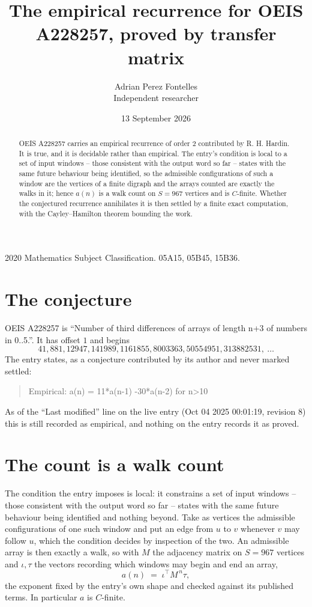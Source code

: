 \documentclass[11pt,a4paper]{article}
\title{The empirical recurrence for OEIS A228257, proved by transfer matrix}
\author{Adrian Perez Fontelles\\ \small Independent researcher}
\date{13 September 2026}
\theoremstyle{plain}
\theoremstyle{definition}
\begin{document}
\maketitle

\begin{abstract}
OEIS A228257 carries an empirical recurrence of order $2$ contributed by R. H. Hardin. It is
true, and it is decidable rather than empirical. The entry's condition is local to a set of input windows -- those consistent with the output word so far -- states with the same future behaviour being identified, so
the admissible configurations of such a window are the vertices of a finite digraph and the
arrays counted are exactly the walks in it; hence $a(n)$ is a walk count on $S=967$ vertices
and is $C$-finite. Whether the conjectured recurrence annihilates it is then settled by a
finite exact computation, with the Cayley--Hamilton theorem bounding the work.
\end{abstract}

\noindent\small 2020 Mathematics Subject Classification. 05A15, 05B45, 15B36.\normalsize

\section{The conjecture}

OEIS A228257 is ``Number of third differences of arrays of length n+3 of numbers in 0..5.''. It has offset $1$ and begins
\[
41, 881, 12947, 141989, 1161855, 8003363, 50554951, 313882531,\ \dots
\]
The entry states, as a conjecture contributed by its author and never marked settled:
\begin{quote}
Empirical: a(n) = 11*a(n-1) -30*a(n-2) for n>10
\end{quote}
As of the ``Last modified'' line on the live entry (Oct 04 2025 00:01:19, revision 8) this is still
recorded as empirical, and nothing on the entry records it as proved.

\section{The count is a walk count}

The condition the entry imposes is local: it constrains a set of input windows -- those consistent with the output word so far -- states with the same future behaviour being identified and nothing beyond. Take as
vertices the admissible configurations of one such window and put an edge from $u$ to $v$
whenever $v$ may follow $u$, which the condition decides by inspection of the two. An
admissible array is then exactly a walk, so with $M$ the adjacency matrix on $S=967$ vertices
and $\iota,\tau$ the vectors recording which windows may begin and end an array,
\[
a(n)\;=\;\iota^{\!\top}M^{\,n}\tau ,
\]
the exponent fixed by the entry's own shape and checked against its published terms. In
particular $a$ is $C$-finite.
\end{document}
